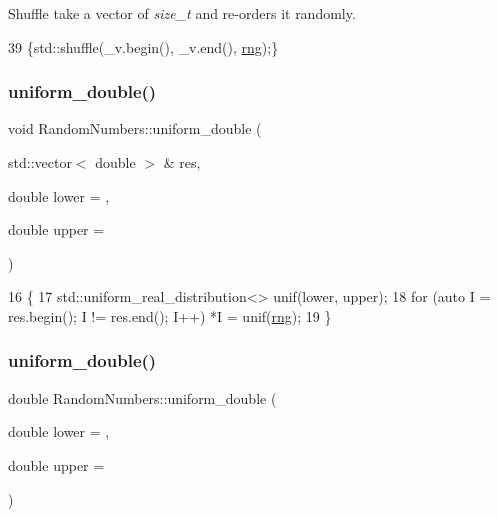 Shuffle take a vector of {\itshape size\+\_\+t} and re-\/orders it randomly. 
\begin{DoxyCode}
39 \{std::shuffle(\_v.begin(), \_v.end(), \mbox{\hyperlink{classRandomNumbers_a15ceee85d6d00de12ae76c90aaec2f14}{rng}});\}
\end{DoxyCode}
\mbox{\label{classRandomNumbers_ae226c129494f9055ac37ed1af943d010}} 
\subsubsection{\texorpdfstring{uniform\+\_\+double()}{uniform\_double()}\hspace{0.1cm}{\footnotesize\ttfamily [1/2]}}
{\footnotesize\ttfamily void Random\+Numbers\+::uniform\+\_\+double (\begin{DoxyParamCaption}\item[{std\+::vector$<$ double $>$ \&}]{res,  }\item[{double}]{lower = {},  }\item[{double}]{upper = {} }\end{DoxyParamCaption})}


\begin{DoxyCode}
16                                                                                      \{
17     std::uniform\_real\_distribution<> unif(lower, upper);
18     \textcolor{keywordflow}{for} (\textcolor{keyword}{auto} I = res.begin(); I != res.end(); I++) *I = unif(\mbox{\hyperlink{classRandomNumbers_a15ceee85d6d00de12ae76c90aaec2f14}{rng}});
19 \}
\end{DoxyCode}
\mbox{\label{classRandomNumbers_a1e66bf9926ad3916f3804dd20ea393f1}} 
\subsubsection{\texorpdfstring{uniform\+\_\+double()}{uniform\_double()}\hspace{0.1cm}{\footnotesize\ttfamily [2/2]}}
{\footnotesize\ttfamily double Random\+Numbers\+::uniform\+\_\+double (\begin{DoxyParamCaption}\item[{double}]{lower = {},  }\item[{double}]{upper = {} }\end{DoxyParamCaption})}



